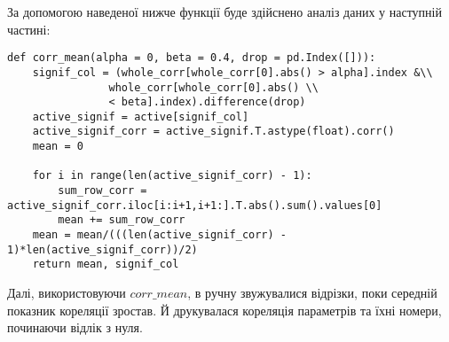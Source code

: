\documentclass[12pt,a4paper]{article}
\theoremstyle{myplain}
\numberwithin{equation}{section}
\begin{document}
За допомогою наведеної нижче функції буде здійснено аналіз даних у наступній частині:

\begin{lstlisting}
def corr_mean(alpha = 0, beta = 0.4, drop = pd.Index([])):
    signif_col = (whole_corr[whole_corr[0].abs() > alpha].index &\\
    			whole_corr[whole_corr[0].abs() \\
    			< beta].index).difference(drop)
    active_signif = active[signif_col]
    active_signif_corr = active_signif.T.astype(float).corr()
    mean = 0

    for i in range(len(active_signif_corr) - 1):
        sum_row_corr = active_signif_corr.iloc[i:i+1,i+1:].T.abs().sum().values[0]
        mean += sum_row_corr
    mean = mean/(((len(active_signif_corr) - 1)*len(active_signif_corr))/2)
    return mean, signif_col
\end{lstlisting}

Далі, використовуючи $corr\_mean$, в ручну звужувалися відрізки, поки середній показник кореляції зростав. Й друкувалася кореляція параметрів та їхні номери, починаючи відлік з нуля.

\end{document}
